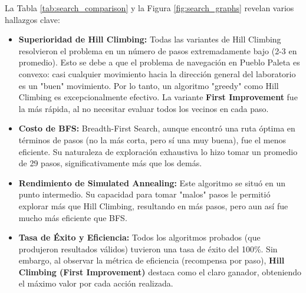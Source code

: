 \documentclass[12pt, oneside, openany]{book}
\begin{document}
\begin{table}[H]
\centering
\caption{Comparación de Algoritmos de Búsqueda}
\label{tab:search_comparison}
\end{table}

La Tabla \ref{tab:search_comparison} y la Figura \ref{fig:search_graphs} revelan varios hallazgos clave:
\begin{itemize}
    \item \textbf{Superioridad de Hill Climbing:} Todas las variantes de Hill Climbing resolvieron el problema en un número de pasos extremadamente bajo (2-3 en promedio). Esto se debe a que el problema de navegación en Pueblo Paleta es convexo: casi cualquier movimiento hacia la dirección general del laboratorio es un "buen" movimiento. Por lo tanto, un algoritmo "greedy" como Hill Climbing es excepcionalmente efectivo. La variante \textbf{First Improvement} fue la más rápida, al no necesitar evaluar todos los vecinos en cada paso.
    \item \textbf{Costo de BFS:} Breadth-First Search, aunque encontró una ruta óptima en términos de pasos (no la más corta, pero sí una muy buena), fue el menos eficiente. Su naturaleza de exploración exhaustiva lo hizo tomar un promedio de 29 pasos, significativamente más que los demás.
    \item \textbf{Rendimiento de Simulated Annealing:} Este algoritmo se situó en un punto intermedio. Su capacidad para tomar "malos" pasos le permitió explorar más que Hill Climbing, resultando en más pasos, pero aun así fue mucho más eficiente que BFS.
    \item \textbf{Tasa de Éxito y Eficiencia:} Todos los algoritmos probados (que produjeron resultados válidos) tuvieron una tasa de éxito del 100\%. Sin embargo, al observar la métrica de eficiencia (recompensa por paso), \textbf{Hill Climbing (First Improvement)} destaca como el claro ganador, obteniendo el máximo valor por cada acción realizada.
\end{itemize}
\end{document}
